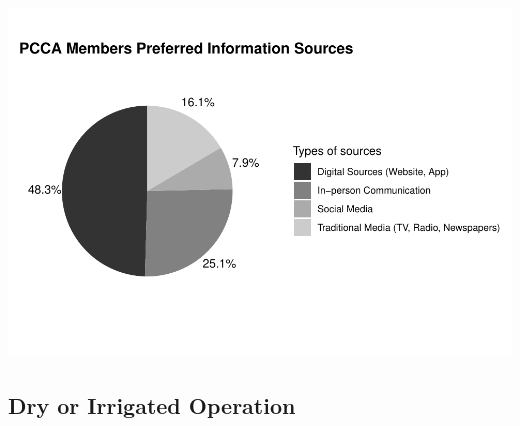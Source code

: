 \documentclass[
]{article}
\begin{document}
\includegraphics{pcca_survey_files/figure-latex/preferred-all-1.pdf}

\hypertarget{dry-or-irrigated-operation}{%
\subsection{Dry or Irrigated
Operation}\label{dry-or-irrigated-operation}}
\end{document}
